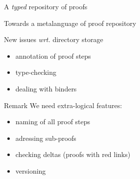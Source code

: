 \documentclass[ignorenonframetext,red]{beamer}
\begin{document}
\begin{frame}[fragile]{A \emph{typed} repository of proofs}
\begin{center}
  \end{center}
\end{frame}

\begin{frame}{Towards a metalanguage of proof repository}
  \begin{block}{New issues \emph{wrt.} directory storage}
    \begin{itemize}
    \item annotation of proof steps
    \item type-checking
    \item dealing with binders
    \end{itemize}
  \end{block}
  \begin{block}{Remark}
    We need extra-logical features:
    \begin{itemize}
    \item naming of all proof steps
    \item adressing sub-proofs
    \item checking deltas (proofs with red links)
    \item versioning
    \end{itemize}
  \end{block}
\end{frame}
\end{document}
